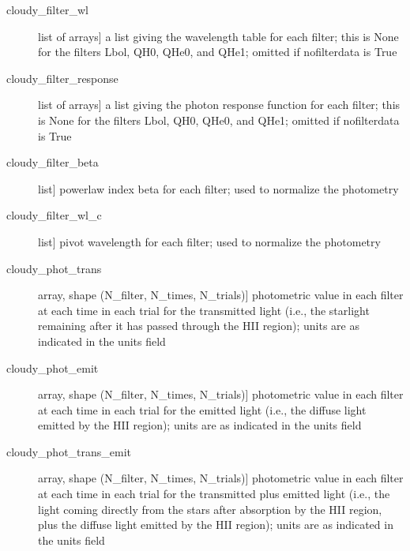 \documentclass[letterpaper,10pt,english]{sphinxmanual}
\begin{document}
\begin{fulllineitems}
\begin{description}
\begin{description}
\item[{cloudy\_filter\_wl}] \leavevmode{[}list of arrays{]}
a list giving the wavelength table for each filter; this is
None for the filters Lbol, QH0, QHe0, and QHe1; omitted if
nofilterdata is True

\item[{cloudy\_filter\_response}] \leavevmode{[}list of arrays{]}
a list giving the photon response function for each filter;
this is None for the filters Lbol, QH0, QHe0, and QHe1; omitted
if nofilterdata is True

\item[{cloudy\_filter\_beta}] \leavevmode{[}list{]}
powerlaw index beta for each filter; used to normalize the
photometry

\item[{cloudy\_filter\_wl\_c}] \leavevmode{[}list{]}
pivot wavelength for each filter; used to normalize the photometry

\item[{cloudy\_phot\_trans}] \leavevmode{[}array, shape (N\_filter, N\_times, N\_trials){]}
photometric value in each filter at each time in each trial for
the transmitted light (i.e., the starlight remaining after it
has passed through the HII region); units are as indicated in
the units field

\item[{cloudy\_phot\_emit}] \leavevmode{[}array, shape (N\_filter, N\_times, N\_trials){]}
photometric value in each filter at each time in each trial for
the emitted light (i.e., the diffuse light emitted by the HII
region); units are as indicated in the units field

\item[{cloudy\_phot\_trans\_emit}] \leavevmode{[}array, shape (N\_filter, N\_times, N\_trials){]}
photometric value in each filter at each time in each trial for
the transmitted plus emitted light (i.e., the light coming
directly from the stars after absorption by the HII region,
plus the diffuse light emitted by the HII region); units are as
indicated in the units field

\end{description}

\end{description}

\end{fulllineitems}

\end{document}
